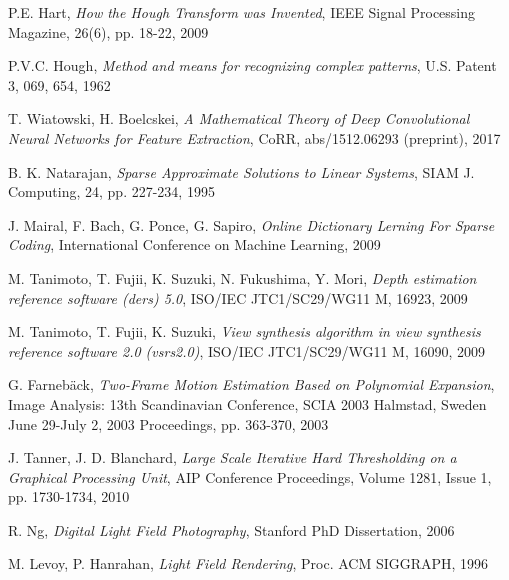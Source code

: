 \documentclass[11pt, english, singlespacing, headsepline, ]{MastersDoctoralThesis}
\theoremstyle{definition}
\begin{document}
\begin{thebibliography}{90}
	P.E. Hart, 
	\emph{How the Hough Transform was Invented},
	IEEE Signal Processing Magazine, 26(6), pp. 18-22,
	2009

	P.V.C. Hough, 
	\emph{Method and means for recognizing complex patterns},
	U.S. Patent 3, 069, 654, 
	1962

	T. Wiatowski, H. Boelcskei,
	\emph{A Mathematical Theory of Deep Convolutional Neural Networks for Feature Extraction},
	CoRR, abs/1512.06293 (preprint), 
	2017

	B. K. Natarajan, 
	\emph{Sparse Approximate Solutions to Linear Systems},
	SIAM J. Computing, 24, pp. 227-234,
	1995

	J. Mairal, F. Bach, G. Ponce, G. Sapiro, 
	\emph{Online Dictionary Lerning For Sparse Coding}, 
	International Conference on Machine Learning,
	2009

	M. Tanimoto, T. Fujii, K. Suzuki, N. Fukushima, Y. Mori,
	\emph{Depth estimation reference software (ders) 5.0},
	ISO/IEC JTC1/SC29/WG11 M, 16923, 
	2009

	M. Tanimoto, T. Fujii, K. Suzuki, 
	\emph{View synthesis algorithm in view synthesis reference software 2.0 (vsrs2.0)}, 
	ISO/IEC JTC1/SC29/WG11 M, 16090,
	2009

	G. Farneb\"ack,
	\emph{Two-Frame Motion Estimation Based on Polynomial Expansion},
	Image Analysis: 13th Scandinavian Conference, SCIA 2003 Halmstad, Sweden June 29-July 2, 2003 Proceedings, pp. 363-370,
	2003

	J. Tanner, J. D. Blanchard, 
	\emph{Large Scale Iterative Hard Thresholding on a Graphical Processing Unit},
	AIP Conference Proceedings, Volume 1281, Issue 1, pp. 1730-1734,
	2010

	R. Ng,
	\emph{Digital Light Field Photography},
	Stanford PhD Dissertation, 
	2006

	M. Levoy, P. Hanrahan,
	\emph{Light Field Rendering},
	Proc. ACM SIGGRAPH,
	1996

\end{thebibliography}

\end{document}
